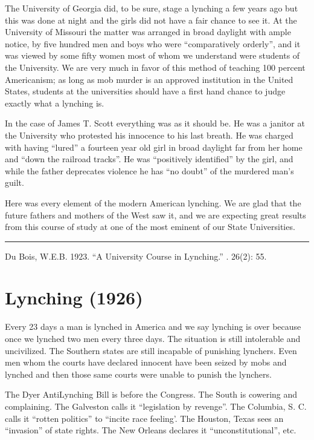 \documentclass[letterpaper,10pt,english]{jupyterBook}
\begin{document}
\sphinxAtStartPar
The University of Georgia did, to be sure, stage a lynching a few years ago but this was done at night and the girls did not have a fair chance to see it. At the University of Missouri the matter was arranged in broad daylight with ample notice, by five hundred men and boys who were “comparatively orderly”, and it was viewed by some fifty women most of whom we understand were students of the University. We are very much in favor of this method of teaching 100 percent Americanism; as long as mob murder is an approved institution in the United States, students at the universities should have a first hand chance to judge exactly what a lynching is.

\sphinxAtStartPar
In the case of James T. Scott everything was as it should be. He was a janitor at the University who protested his innocence to his last breath. He was charged with having “lured” a fourteen year old girl in broad daylight far from her home and “down the railroad tracks”. He was “positively identified” by the girl, and while the father deprecates violence he has “no doubt” of the murdered man’s guilt.

\sphinxAtStartPar
Here was every element of the modern American lynching. We are glad that the future fathers and mothers of the West saw it, and we are expecting great results from this course of study at one of the most eminent of our State Universities.


\bigskip\hrule\bigskip


\sphinxAtStartPar
{} Du Bois, W.E.B. 1923. “A University Course in Lynching.” . 26(2): 55.


\section{Lynching (1926)}
\label{\detokenize{Volumes/32/01/lynching:lynching-1926}}\label{\detokenize{Volumes/32/01/lynching::doc}}
\sphinxAtStartPar
Every 23 days a man is lynched in America and we say lynching is over because once we lynched two men every three days. The situation is still intolerable and uncivilized. The Southern states are still incapable of punishing lynchers. Even men whom the courts have declared innocent have been seized by mobs and lynched and then those same courts were unable to punish the lynchers.

\sphinxAtStartPar
The Dyer Anti\sphinxhyphen{}Lynching Bill is before the Congress. The South is cowering and complaining. The Galveston  calls it “legislation by revenge”. The Columbia, S. C.  calls it “rotten politics” to “incite race feeling’. The Houston, Texas  sees an “invasion” of state rights. The New Orleans  declares it “unconstitutional”, etc.
\end{document}
